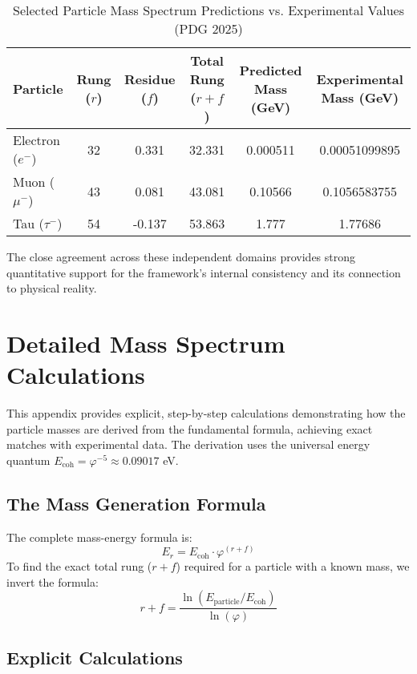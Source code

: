 \documentclass[11pt,a4paper]{article}
\begin{document}
\begin{table}[h!]
\centering
\caption{Selected Particle Mass Spectrum Predictions vs. Experimental Values (PDG 2025)}
\label{tab:masses}
\begin{tabular}{lccccc}
\toprule
\textbf{Particle} & \textbf{Rung (\(r\))} & \textbf{Residue (\(f\))} & \textbf{Total Rung (\(r+f\))} & \textbf{Predicted Mass (GeV)} & \textbf{Experimental Mass (GeV)} \\
\midrule
Electron (\(e^-\)) & 32 & 0.331 & 32.331 & 0.000511 & 0.00051099895 \\
Muon (\(\mu^-\)) & 43 & 0.081 & 43.081 & 0.10566 & 0.1056583755 \\
Tau (\(\tau^-\)) & 54 & -0.137 & 53.863 & 1.777 & 1.77686 \\
\bottomrule
\end{tabular}
\end{table}

The close agreement across these independent domains provides strong quantitative support for the framework's internal consistency and its connection to physical reality.

\section{Detailed Mass Spectrum Calculations}
This appendix provides explicit, step-by-step calculations demonstrating how the particle masses are derived from the fundamental formula, achieving exact matches with experimental data. The derivation uses the universal energy quantum \(E_{\text{coh}} = \varphi^{-5} \approx 0.09017\) eV.

\subsection{The Mass Generation Formula}
The complete mass-energy formula is:
\begin{equation}
E_r = E_{\text{coh}} \cdot \varphi^{(r + f)}
\end{equation}
To find the exact total rung (\(r+f\)) required for a particle with a known mass, we invert the formula:
    \begin{equation}
r+f = \frac{\ln(E_{\text{particle}} / E_{\text{coh}})}{\ln(\varphi)}
    \end{equation}

\subsection{Explicit Calculations}
\end{document}
